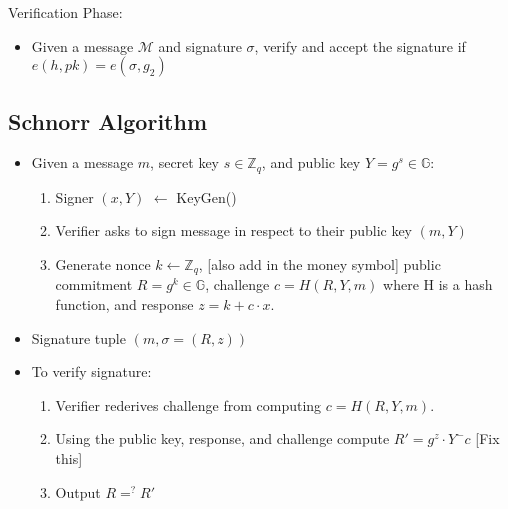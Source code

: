 \documentclass[12pt]{article}
\begin{document}
Verification Phase:
\begin{itemize}
    \item Given a message \( \mathcal{M} \) and signature \( \sigma \), verify and accept the signature if 
    \( e(h, pk) = e(\sigma, g_2) \)
\end{itemize}

\subsection{Schnorr Algorithm}\label{subsec:schnorr}

\begin{itemize}
    \item Given a message \(m\), secret key \(s \in \mathbb{Z}_q\), and public key \(Y = g^s \in \mathbb{G}\):
    \begin{enumerate}
        \item Signer \( (x, Y)\) \( \leftarrow\) KeyGen()
        \item Verifier asks to sign message in respect to their public key \( (m, Y)\)
        \item Generate nonce \( k \leftarrow \mathbb{Z}_q \), [also add in the money symbol] public commitment \(R = g^k \in \mathbb{G}\), challenge \(c =H(R, Y, m)\) where H is a hash function, and response \(z =k+c \cdot x\).
    \end{enumerate}
    \item Signature tuple \( (m, \sigma = (R, z))\)
    \item To verify signature:
    \begin{enumerate}
        \item Verifier rederives challenge from computing \(c= H( R, Y, m)\).
        \item Using the public key, response, and challenge compute \( R'= g^z \cdot Y^-c\) [Fix this]
        \item Output \( R =^? R'\)
    \end{enumerate}
\end{itemize}
\end{document}

